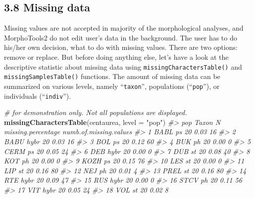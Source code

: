 \documentclass[
]{article}
\newenvironment{Shaded}{\begin{snugshade}}{\end{snugshade}}
\newcommand{\CommentTok}[1]{\textcolor[rgb]{0.56,0.35,0.01}{\textit{#1}}}
\newcommand{\DataTypeTok}[1]{\textcolor[rgb]{0.13,0.29,0.53}{#1}}
\newcommand{\KeywordTok}[1]{\textcolor[rgb]{0.13,0.29,0.53}{\textbf{#1}}}
\newcommand{\NormalTok}[1]{#1}
\newcommand{\StringTok}[1]{\textcolor[rgb]{0.31,0.60,0.02}{#1}}
\begin{document}
\hypertarget{missing-data}{%
\subsection{3.8 Missing data}\label{missing-data}}

Missing values are not accepted in majority of the morphological
analyses, and MorphoTools2 do not edit user's data in the background.
The user has to do his/her own decision, what to do with missing values.
There are two options: remove or replace. But before doing anything
else, let's have a look at the descriptive statistic about missing data
using \texttt{missingCharactersTable()} and
\texttt{missingSamplesTable()} functions. The amount of missing data can
be summarized on various levels, namely ``\texttt{taxon}'', populations
(``\texttt{pop}''), or individuals (``\texttt{indiv}'').

\begin{Shaded}
\begin{Highlighting}[]
\CommentTok{# for demonstration only. Not all populations are displayed.}
\KeywordTok{missingCharactersTable}\NormalTok{(centaurea, }\DataTypeTok{level =} \StringTok{"pop"}\NormalTok{)}
\CommentTok{#>     pop Taxon  N missing.percentage numb.of.missing.values}
\CommentTok{#> 1  BABL    ps 20               0.03                     16}
\CommentTok{#> 2  BABU  hybr 20               0.03                     16}
\CommentTok{#> 3   BOL    ps 20               0.12                     60}
\CommentTok{#> 4   BUK    ph 20               0.00                      0}
\CommentTok{#> 5  CERM    ps 20               0.05                     24}
\CommentTok{#> 6   DEB  hybr 20               0.00                      0}
\CommentTok{#> 7   DUB    st 20               0.08                     40}
\CommentTok{#> 8   KOT    ph 20               0.00                      0}
\CommentTok{#> 9  KOZH    ps 20               0.15                     76}
\CommentTok{#> 10  LES    st 20               0.00                      0}
\CommentTok{#> 11  LIP    st 20               0.16                     80}
\CommentTok{#> 12  NEJ    ph 20               0.01                      4}
\CommentTok{#> 13 PREL    st 20               0.16                     80}
\CommentTok{#> 14  RTE  hybr 20               0.09                     47}
\CommentTok{#> 15  RUS  hybr 20               0.00                      0}
\CommentTok{#> 16 STCV    ph 20               0.11                     56}
\CommentTok{#> 17  VIT  hybr 20               0.05                     24}
\CommentTok{#> 18  VOL    st 20               0.02                      8}
\end{Highlighting}
\end{Shaded}
\end{document}

